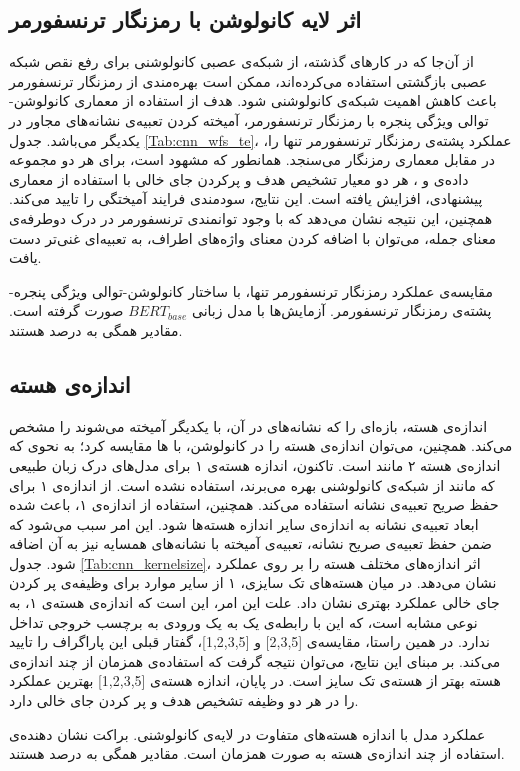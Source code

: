 \subsection{اثر لایه کانولوشن با رمزنگار ترنسفورمر}
از آن‌جا که در کارهای گذشته، از شبکه‌ی عصبی کانولوشنی برای رفع نقص شبکه عصبی بازگشتی استفاده می‌کرده‌اند، ممکن است بهره‌مندی از رمزنگار ترنسفورمر باعث کاهش اهمیت شبکه‌ی کانولوشنی شود. هدف از استفاده از معماری کانولوشن-توالی ویژگی پنجره با رمزنگار ترنسفورمر، آمیخته کردن تعبیه‌ی نشانه‌های مجاور در یکدیگر می‌باشد. جدول \ref{Tab:cnn_wfs_te}، عملکرد پشته‌ی رمزنگار ترنسفورمر تنها را، در مقابل معماری رمزنگار  می‌سنجد. همانطور که مشهود است، برای هر دو مجموعه داده‌ی  و ، هر دو معیار تشخیص هدف و پرکردن جای خالی با استفاده از معماری پیشنهادی، افزایش یافته است. این نتایج، سودمندی فرایند آمیختگی را تایید می‌کند. همچنین، این نتیجه نشان می‌دهد که با وجود توانمندی ترنسفورمر در درک دوطرفه‌ی معنای جمله، می‌توان با اضافه کردن معنای واژه‌های اطراف، به تعبیه‌ای غنی‌تر دست یافت.
\begin{table}[ht]
		
	\caption[مقایسه‌ی عملکرد رمزنگار ترنسفورمر، با ساختار کانولوشن-توالی ویژگی پنجره-پشته‌ی رمزنگار ترنسفورمر]{
		مقایسه‌ی عملکرد رمزنگار ترنسفورمر تنها، با ساختار کانولوشن-توالی ویژگی پنجره-پشته‌ی رمزنگار ترنسفورمر. آزمایش‌ها با مدل زبانی $BERT_{base}$ صورت گرفته است. مقادیر همگی به درصد هستند.
	}
\label{Tab:cnn_wfs_te}
\end{table}
\subsection{اندازه‌ی هسته}
اندازه‌ی هسته، بازه‌ای را که نشانه‌های در آن، با یکدیگر آمیخته می‌شوند را مشخص می‌کند. همچنین، می‌توان اندازه‌ی هسته را در کانولوشن، با ها مقایسه کرد؛ به نحوی که اندازه‌ی هسته ۲ مانند  است. تاکنون، اندازه هسته‌ی ۱ برای مدل‌های درک زبان طبیعی که مانند  از شبکه‌ی کانولوشنی بهره می‌برند، استفاده نشده است.  از اندازه‌ی ۱ برای حفظ صریح تعبیه‌ی نشانه استفاده می‌کند. همچنین، استفاده از اندازه‌ی ۱، باعث شده ابعاد تعبیه‌ی نشانه به اندازه‌ی سایر اندازه هسته‌ها شود. این امر سبب می‌شود که ضمن حفظ تعبیه‌ی صریح نشانه، تعبیه‌ی آمیخته با نشانه‌های همسایه نیز به آن اضافه شود. جدول \ref{Tab:cnn_kernelsize}، اثر اندازه‌های مختلف هسته را بر روی عملکرد  نشان می‌دهد. در میان هسته‌های تک سایزی، ۱ از سایر موارد برای وظیفه‌ی پر کردن جای خالی عملکرد بهتری نشان داد. علت این امر، این است که اندازه‌ی هسته‌ی ۱، به نوعی مشابه  است، که این با رابطه‌ی یک به یک ورودی به برچسب خروجی تداخل ندارد. در همین راستا، مقایسه‌ی [2,3,5] و [1,2,3,5]، گفتار قبلی این پاراگراف را تایید می‌کند. بر مبنای این نتایج، می‌توان نتیجه گرفت که استفاده‌ی همزمان از چند اندازه‌ی هسته بهتر از هسته‌ی تک سایز است. در پایان، اندازه هسته‌ی [1,2,3,5] بهترین عملکرد را در هر دو وظیفه تشخیص هدف و پر کردن جای خالی دارد.
\begin{table}[ht]
		
	\caption[عملکرد مدل با اندازه هسته‌های متفاوت در لایه‌ی کانولوشنی]{
		عملکرد مدل با اندازه هسته‌های متفاوت در لایه‌ی کانولوشنی. براکت نشان دهنده‌ی استفاده از چند اندازه‌ی هسته به صورت همزمان است. مقادیر همگی به درصد هستند.
	}
\label{Tab:cnn_kernelsize}
\end{table}

